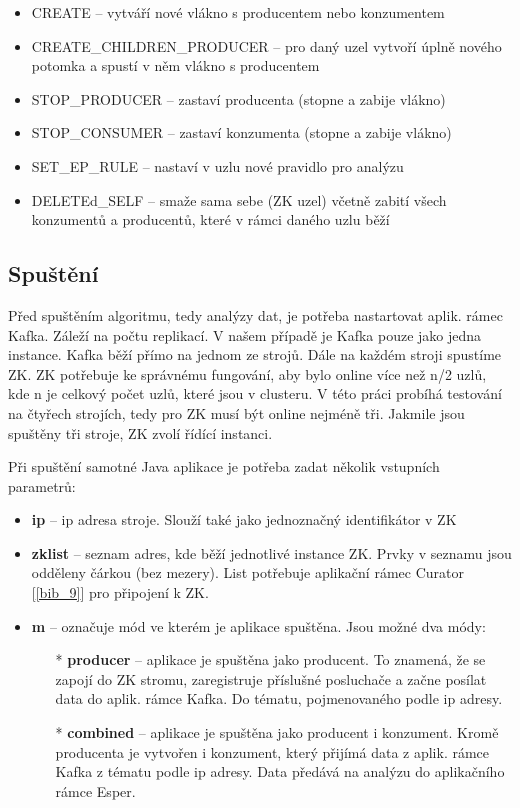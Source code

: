 \documentclass[
  digital, %
  table,   %
  nolof,     %
  nolot,     %
  oneside, %
  nocover,
  monochrome,
  12pt
]{fithesis3}
\begin{document}
\begin{itemize}
  \item CREATE -- vytváří nové vlákno s producentem nebo konzumentem
  \item CREATE\_CHILDREN\_PRODUCER -- pro daný uzel vytvoří úplně nového potomka a spustí v něm vlákno s producentem
  \item STOP\_PRODUCER -- zastaví producenta (stopne a zabije vlákno)
  \item STOP\_CONSUMER -- zastaví konzumenta (stopne a zabije vlákno)
  \item SET\_EP\_RULE -- nastaví v uzlu nové pravidlo pro analýzu
  \item DELETEd\_SELF -- smaže sama sebe (ZK uzel) včetně zabití všech konzumentů a producentů, které v rámci daného uzlu běží
\end{itemize}

\subsection{Spuštění}
Před spuštěním algoritmu, tedy analýzy dat, je potřeba nastartovat aplik. rámec Kafka. Záleží na počtu replikací. V našem případě je Kafka pouze jako jedna instance. Kafka běží přímo na jednom ze strojů. Dále na každém stroji spustíme ZK. ZK potřebuje ke správnému fungování, aby bylo online více než n/2 uzlů, kde n je celkový počet uzlů, které jsou v clusteru. V této práci probíhá testování na čtyřech strojích, tedy pro ZK musí být online nejméně tři. Jakmile jsou spuštěny tři stroje, ZK zvolí řídící instanci.

Při spuštění samotné Java aplikace je potřeba zadat několik vstupních parametrů:

\begin{itemize}
  \item \textbf{ip}  -- ip adresa stroje. Slouží také jako jednoznačný identifikátor v ZK
  \item \textbf{zklist} -- seznam adres, kde běží jednotlivé instance ZK. Prvky v seznamu jsou odděleny čárkou (bez mezery). List potřebuje aplikační rámec Curator [\ref{bib_9}] pro připojení k ZK.
  \item \textbf{m} -- označuje mód ve kterém je aplikace spuštěna. Jsou možné dva módy:
  \begin{itemize}
  	\item[*] \textbf{producer} -- aplikace je spuštěna jako producent. To znamená, že se zapojí do ZK stromu, zaregistruje příslušné posluchače a začne posílat data do aplik. rámce Kafka. Do tématu, pojmenovaného podle ip adresy.
  	\item[*] \textbf{combined} -- aplikace je spuštěna jako producent i konzument. Kromě producenta je vytvořen i konzument, který přijímá data z aplik. rámce Kafka z tématu podle ip adresy. Data předává na analýzu do aplikačního rámce Esper.
  \end{itemize}
\end{itemize}
\end{document}
